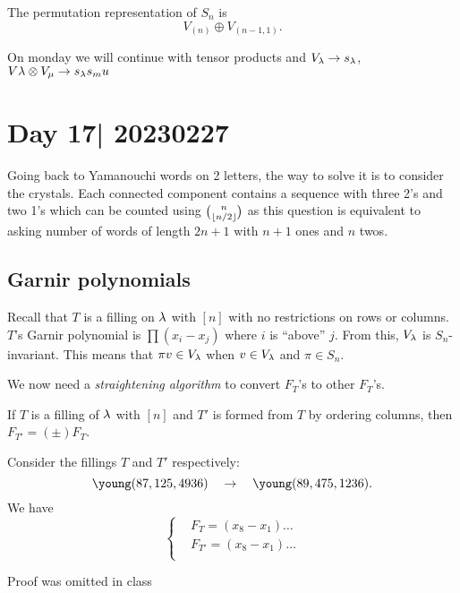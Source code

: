 \documentclass[12pt]{memoir}
\begin{document}
\begin{Lem}
    The permutation representation of $S_n$ is 
    $$V_{(n)}\oplus V_{(n-1,1)}.$$
\end{Lem}

On monday we will continue with tensor products and $V_\lambda\to s_\lambda$, $V\lambda\otimes V_\mu\to s_\lambda s_mu$

\section{Day 17| 20230227}

Going back to Yamanouchi words on 2 letters, the way to solve it is to consider the crystals. Each connected component contains a sequence with three 2's and two 1's which can be counted using $\binom{n}{\lfloor n/2\rfloor}$ as this question is equivalent to asking number of words of length $2n+1$ with $n+1$ ones and $n$ twos.

\subsection{Garnir polynomials}

Recall that $T$ is a filling on $\lambda$ with $[n]$ with no restrictions on rows or columns. $T$'s Garnir polynomial is $\prod(x_i-x_j)$ where $i$ is ``above'' $j$. From this, $V_\lambda$ is $S_n$-invariant. This means that $\pi v\in V_\lambda$ when $v\in V_\lambda$ and $\pi\in S_n$.\par 
We now need a \emph{straightening algorithm} to convert $F_T$'s to other $F_T$'s.

\begin{Lem}
    If $T$ is a filling of $\lambda$ with $[n]$ and $T'$ is formed from $T$ by ordering columns, then $F_{T'}=(\pm)F_T$.
\end{Lem}

\begin{Ex}
    Consider the fillings $T$ and $T'$ respectively: 
    $$\young(87,125,4936)\quad\to\quad\young(89,475,1236).$$
    We have
    $$
    \left\lbrace
    \begin{aligned}
        &F_T=(x_8-x_1)\dots\\
        &F_{T'}=(x_8-x_1)\dots\\
    \end{aligned}
    \right.
    $$
\end{Ex}

Proof was omitted in class 
\end{document}
